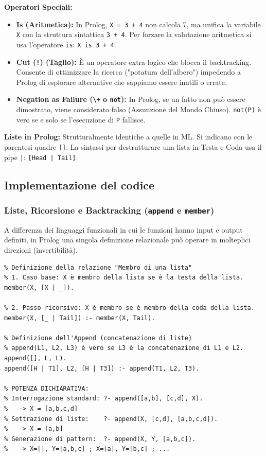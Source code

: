 \documentclass[12pt, a4paper]{article}
\begin{document}
\textbf{Operatori Speciali:}
\begin{itemize}
    \item \textbf{Is (Aritmetica):} In Prolog, \texttt{X = 3 + 4} non calcola 7, ma unifica la variabile \texttt{X} con la struttura sintattica \texttt{3 + 4}. Per forzare la valutazione aritmetica si usa l'operatore \texttt{is}: \texttt{X is 3 + 4}.
    \item \textbf{Cut (\texttt{!}) (Taglio):} È un operatore extra-logico che blocca il backtracking. Consente di ottimizzare la ricerca ("potatura dell'albero") impedendo a Prolog di esplorare alternative che sappiamo essere inutili o errate.
    \item \textbf{Negation as Failure (\texttt{\textbackslash+} o \texttt{not}):} In Prolog, se un fatto non può essere dimostrato, viene considerato falso (Assunzione del Mondo Chiuso). \texttt{not(P)} è vero se e solo se l'esecuzione di \texttt{P} fallisce.
\end{itemize}

\textbf{Liste in Prolog:}
Strutturalmente identiche a quelle in ML. Si indicano con le parentesi quadre \texttt{[]}. La sintassi per destrutturare una lista in Testa e Coda usa il pipe \texttt{|}: \texttt{[Head | Tail]}.


\subsection{Implementazione del codice}

\subsubsection{Liste, Ricorsione e Backtracking (\texttt{append} e \texttt{member})}
A differenza dei linguaggi funzionali in cui le funzioni hanno input e output definiti, in Prolog una singola definizione relazionale può operare in molteplici direzioni (invertibilità).

\begin{verbatim}
% Definizione della relazione "Membro di una lista"
% 1. Caso base: X è membro della lista se è la testa della lista.
member(X, [X | _]).

% 2. Passo ricorsivo: X è membro se è membro della coda della lista.
member(X, [_ | Tail]) :- member(X, Tail).

% Definizione dell'Append (concatenazione di liste)
% append(L1, L2, L3) è vero se L3 è la concatenazione di L1 e L2.
append([], L, L).
append([H | T1], L2, [H | T3]) :- append(T1, L2, T3).

% POTENZA DICHIARATIVA:
% Interrogazione standard: ?- append([a,b], [c,d], X). 
%   -> X = [a,b,c,d]
% Sottrazione di liste:    ?- append(X, [c,d], [a,b,c,d]). 
%   -> X = [a,b]
% Generazione di pattern:  ?- append(X, Y, [a,b,c]).
%   -> X=[], Y=[a,b,c] ; X=[a], Y=[b,c] ; ...
\end{verbatim}
\end{document}
